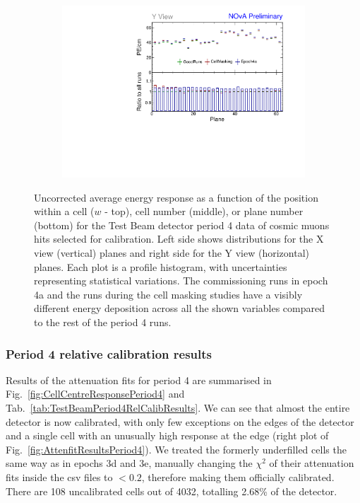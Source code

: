 \begin{figure}[!hbtp]
\begin{subfigure}[b]{0.495\textwidth}
\end{subfigure}
\begin{subfigure}[b]{0.495\textwidth}
\centering
\includegraphics[width=\textwidth]{Plots/TBCalibration/Attenprofs_P4Data_PlanePE_Y_Combined.pdf}
\end{subfigure}
\caption[Uncorrected energy response along $w$, cell and plane for period 4]{Uncorrected average energy response as a function of the position within a cell ($w$ - top), cell number (middle), or plane number (bottom) for the Test Beam detector period 4 data of cosmic muons hits selected for calibration. Left side shows distributions for the X view (vertical) planes and right side for the Y view (horizontal) planes. Each plot is a profile histogram, with uncertainties representing statistical variations. The commissioning runs in epoch 4a and the runs during the cell masking studies have a visibly different energy deposition across all the shown variables compared to the rest of the period 4 runs.}
\label{fig:Calibhist_period4}
\end{figure}

\subsubsection*{Period 4 relative calibration results}

Results of the attenuation fits for period 4 are summarised in Fig.~\ref{fig:CellCentreResponsePeriod4} and Tab.~\ref{tab:TestBeamPeriod4RelCalibResults}. We can see that almost the entire detector is now calibrated, with only few exceptions on the edges of the detector and a single cell with an unusually high response at the edge (right plot of Fig.~\ref{fig:AttenfitResultsPeriod4}). We treated the formerly underfilled cells the same way as in epochs 3d and 3e, manually changing the $\chi^2$ of their attenuation fits inside the csv files to $<0.2$, therefore making them officially calibrated. There are 108 uncalibrated cells out of 4032, totalling 2.68\% of the detector.

